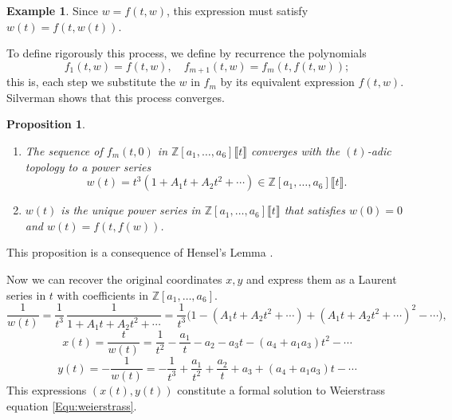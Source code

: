 \documentclass{report}
\newtheorem{proposition}[theorem]{Proposition}
\theoremstyle{definition}
\newtheorem{example}[theorem]{Example}
\begin{document}
\begin{example}
Since $w=f(t,w)$, this expression must satisfy $w(t)=f(t,w(t))$.

To define rigorously this process, we define by recurrence the polynomials
\[f_1(t,w)=f(t,w),\quad f_{m+1}(t,w)=f_m(t,f(t,w));\]
this is, each step we substitute the $w$ in $f_m$ by its equivalent expression $f(t,w)$. Silverman \cite[Proposition~IV.1.1]{silverman2009arithmetic} shows that this process converges.

\begin{proposition}
\begin{enumerate}[label=(\arabic*)]
\item The sequence of $f_m(t,0)$ in $\mathbb{Z}[a_1,\ldots,a_6]\llbracket t\rrbracket$ converges with the $(t)$-adic topology to a power series
\[w(t)=t^3(1+A_1t+A_2t^2+\cdots)\in\mathbb{Z}[a_1,\ldots,a_6]\llbracket t\rrbracket.\]
\item $w(t)$ is the unique power series in $\mathbb{Z}[a_1,\ldots,a_6]\llbracket t\rrbracket$ that satisfies $w(0)=0$ and $w(t)=f(t,f(w))$.
\end{enumerate}
\end{proposition}

This proposition is a consequence of Hensel's Lemma \cite[Lemma~IV.1.2]{silverman2009arithmetic}.

Now we can recover the original coordinates $x,y$ and express them as a Laurent series in $t$ with coefficients in $\mathbb{Z}[a_1,\ldots,a_6]$.
\[\frac{1}{w(t)}=\frac{1}{t^3}\,\frac{1}{1+A_1t+A_2t^2+\cdots}=\frac{1}{t^3}\big(1-(A_1t+A_2t^2+\cdots)+(A_1t+A_2t^2+\cdots)^2-\cdots\big),\]
\[x(t)=\frac{t}{w(t)}=\frac{1}{t^2}-\frac{a_1}{t}-a_2-a_3t-(a_4+a_1a_3)t^2-\cdots\]
\[y(t)=-\frac{1}{w(t)}=-\frac{1}{t^3}+\frac{a_1}{t^2}+\frac{a_2}{t}+a_3+(a_4+a_1a_3)t-\cdots\]
This expressions $(x(t),y(t))$ constitute a formal solution to Weierstrass equation \eqref{Equ:weierstrass}.


\end{example}
\end{document}
